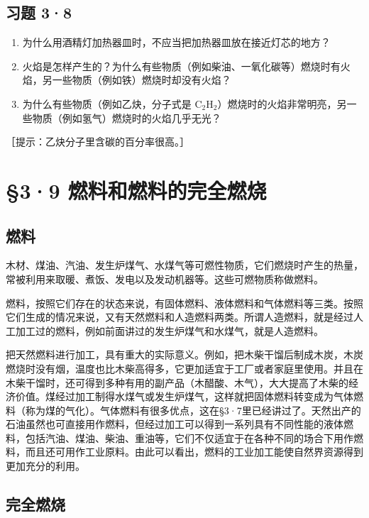 \subsection{习题 3·8}

\begin{enumerate}
\item
  为什么用酒精灯加热器皿时，不应当把加热器皿放在接近灯芯的地方？
\item
  火焰是怎样产生的？为什么有些物质（例如柴油、一氧化碳等）燃烧时有火焰，另一些物质（例如铁）燃烧时却没有火焰？
\item
  为什么有些物质（例如乙炔，分子式是
  \(\mathrm{C}_2\mathrm{H}_2\)）燃烧时的火焰非常明亮，另一些物质（例如氢气）燃烧时的火焰几乎无光？
\end{enumerate}

［提示：乙炔分子里含碳的百分率很高。］

\section{§3·9 燃料和燃料的完全燃烧}

\subsection{燃料}

木材、煤油、汽油、发生炉煤气、水煤气等可燃性物质，它们燃烧时产生的热量，常被利用来取暖、煮饭、发电以及发动机器等。这些可燃物质称做燃料。

燃料，按照它们存在的状态来说，有固体燃料、液体燃料和气体燃料等三类。按照它们生成的情况来说，又有天然燃料和人造燃料两类。所谓人造燃料，就是经过人工加工过的燃料，例如前面讲过的发生炉煤气和水煤气，就是人造燃料。

把天然燃料进行加工，具有重大的实际意义。例如，把木柴干馏后制成木炭，木炭燃烧时没有烟，温度也比木柴高得多，它更加适宜于工厂或者家庭里使用。并且在木柴干馏时，还可得到多种有用的副产品（木醋酸、木气），大大提高了木柴的经济价值。煤经过加工制得水煤气或发生炉煤气，这样就把固体燃料转变成为气体燃料（称为煤的气化）。气体燃料有很多优点，这在§3·7里已经讲过了。天然出产的石油虽然也可直接用作燃料，但经过加工可以得到一系列具有不同性能的液体燃料，包括汽油、煤油、柴油、重油等，它们不仅适宜于在各种不同的场合下用作燃料，而且还可用作工业原料。由此可以看出，燃料的工业加工能使自然界资源得到更加充分的利用。

\subsection{完全燃烧}


